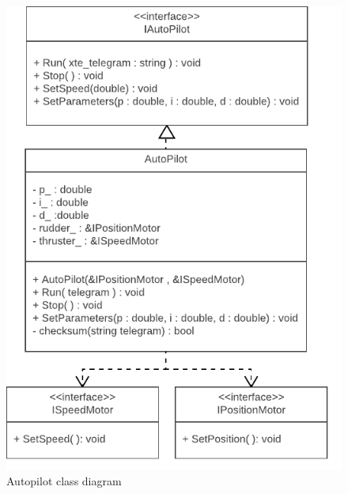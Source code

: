 \begin{figure}[H]
\centering
\includegraphics[width=1\linewidth]{Autopilot_class_diagram}
\caption{Autopilot class diagram}
\label{fig:Autopilot}
\end{figure}